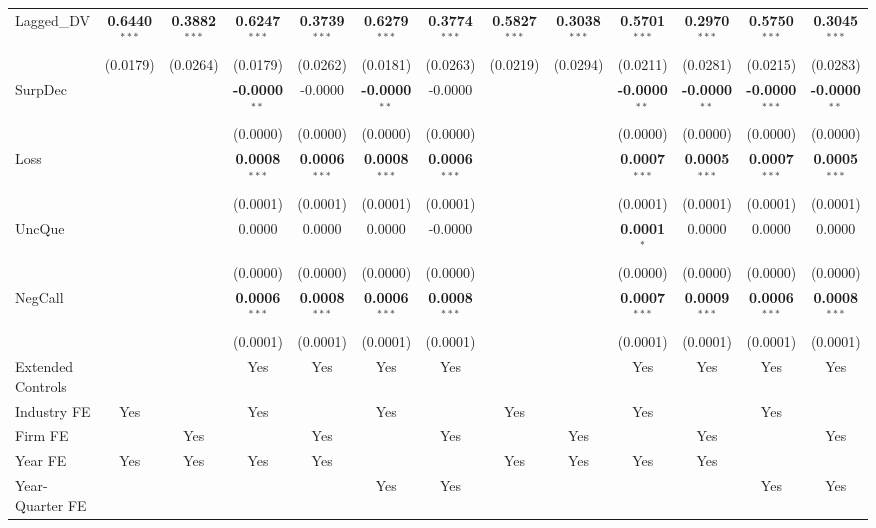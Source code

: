 \documentclass[11pt,a4paper]{article}
\begin{document}
\begin{table}[htbp]
\begin{tabular}{lcccccccccccc}
Lagged\_DV & \textbf{0.6440}$^{***}$ & \textbf{0.3882}$^{***}$ & \textbf{0.6247}$^{***}$ & \textbf{0.3739}$^{***}$ & \textbf{0.6279}$^{***}$ & \textbf{0.3774}$^{***}$ & \textbf{0.5827}$^{***}$ & \textbf{0.3038}$^{***}$ & \textbf{0.5701}$^{***}$ & \textbf{0.2970}$^{***}$ & \textbf{0.5750}$^{***}$ & \textbf{0.3045}$^{***}$ \\
 & (0.0179) & (0.0264) & (0.0179) & (0.0262) & (0.0181) & (0.0263) & (0.0219) & (0.0294) & (0.0211) & (0.0281) & (0.0215) & (0.0283) \\
SurpDec &  &  & \textbf{-0.0000}$^{**}$ & -0.0000 & \textbf{-0.0000}$^{**}$ & -0.0000 &  &  & \textbf{-0.0000}$^{**}$ & \textbf{-0.0000}$^{**}$ & \textbf{-0.0000}$^{***}$ & \textbf{-0.0000}$^{**}$ \\
 &  &  & (0.0000) & (0.0000) & (0.0000) & (0.0000) &  &  & (0.0000) & (0.0000) & (0.0000) & (0.0000) \\
Loss &  &  & \textbf{0.0008}$^{***}$ & \textbf{0.0006}$^{***}$ & \textbf{0.0008}$^{***}$ & \textbf{0.0006}$^{***}$ &  &  & \textbf{0.0007}$^{***}$ & \textbf{0.0005}$^{***}$ & \textbf{0.0007}$^{***}$ & \textbf{0.0005}$^{***}$ \\
 &  &  & (0.0001) & (0.0001) & (0.0001) & (0.0001) &  &  & (0.0001) & (0.0001) & (0.0001) & (0.0001) \\
UncQue &  &  & 0.0000 & 0.0000 & 0.0000 & -0.0000 &  &  & \textbf{0.0001}$^{*}$ & 0.0000 & 0.0000 & 0.0000 \\
 &  &  & (0.0000) & (0.0000) & (0.0000) & (0.0000) &  &  & (0.0000) & (0.0000) & (0.0000) & (0.0000) \\
NegCall &  &  & \textbf{0.0006}$^{***}$ & \textbf{0.0008}$^{***}$ & \textbf{0.0006}$^{***}$ & \textbf{0.0008}$^{***}$ &  &  & \textbf{0.0007}$^{***}$ & \textbf{0.0009}$^{***}$ & \textbf{0.0006}$^{***}$ & \textbf{0.0008}$^{***}$ \\
 &  &  & (0.0001) & (0.0001) & (0.0001) & (0.0001) &  &  & (0.0001) & (0.0001) & (0.0001) & (0.0001) \\
\midrule
Extended Controls &  &  & Yes & Yes & Yes & Yes &  &  & Yes & Yes & Yes & Yes \\
Industry FE & Yes &  & Yes &  & Yes &  & Yes &  & Yes &  & Yes &  \\
Firm FE &  & Yes &  & Yes &  & Yes &  & Yes &  & Yes &  & Yes \\
Year FE & Yes & Yes & Yes & Yes &  &  & Yes & Yes & Yes & Yes &  &  \\
Year-Quarter FE &  &  &  &  & Yes & Yes &  &  &  &  & Yes & Yes \\

\end{tabular}
\end{table}
\end{document}
